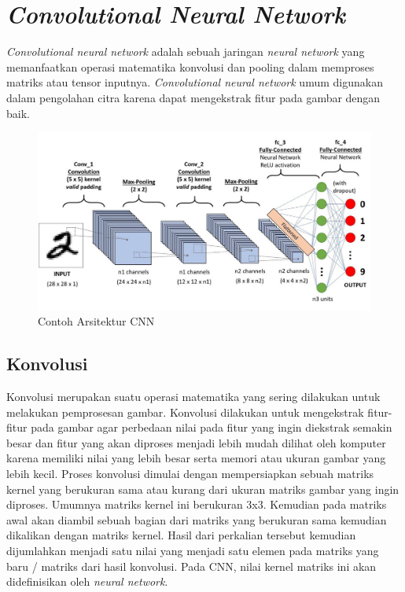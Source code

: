 \section{\textit{Convolutional Neural Network}}
\textit{Convolutional neural network} adalah sebuah jaringan \textit{neural network} yang memanfaatkan
operasi matematika konvolusi dan pooling dalam memproses matriks atau tensor inputnya.
\textit{Convolutional neural network} umum digunakan dalam pengolahan citra karena dapat mengekstrak
fitur pada gambar dengan baik.

\begin{figure}[h!]
    \begin{center}
      \includegraphics[width= 0.75\linewidth]{bab2/Contoh Arsitektur CNN.jpeg}
      \caption{Contoh Arsitektur CNN}
      \label{fig: Arsi CNN}
    \end{center}
\end{figure}

\subsection{Konvolusi}
Konvolusi merupakan suatu operasi matematika yang sering dilakukan untuk melakukan pemprosesan gambar.
Konvolusi dilakukan untuk mengekstrak fitur-fitur pada gambar agar perbedaan nilai pada fitur yang
ingin diekstrak semakin besar dan fitur yang akan diproses menjadi lebih mudah dilihat oleh komputer
karena memiliki nilai yang lebih besar serta memori atau ukuran gambar yang lebih kecil. Proses konvolusi
dimulai dengan mempersiapkan sebuah matriks kernel yang berukuran sama atau kurang dari ukuran matriks
gambar yang ingin diproses. Umumnya matriks kernel ini berukuran 3x3. Kemudian pada matriks awal akan 
diambil sebuah bagian dari matriks yang berukuran sama kemudian dikalikan dengan matriks kernel. Hasil
dari perkalian tersebut kemudian dijumlahkan menjadi satu nilai yang menjadi satu elemen pada matriks
yang baru / matriks dari hasil konvolusi. Pada CNN, nilai kernel matriks ini akan didefinisikan oleh
\textit{neural network}.

